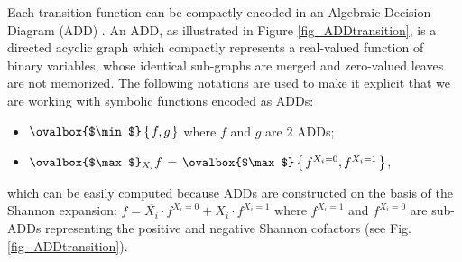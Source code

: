 Each transition function can be compactly encoded in an Algebraic Decision
Diagram (ADD) \cite{Bahar:1997:ADD}. 
An ADD, as illustrated in Figure \ref{fig_ADDtransition}, 
is a directed acyclic graph which compactly represents a
real-valued function of binary variables, whose identical sub-graphs are
merged and zero-valued leaves are not memorized. 
The following notations are used to make it 
explicit that we are working with symbolic functions encoded as ADDs:
\begin{itemize}
\item $\ovalbox{$\min$} \set{f,g}$ where $f$ and $g$ are 2 ADDs;
\item $\ovalbox{$\max$}_{X_i} f$ = $\ovalbox{$\max$} \set{ f^{X_i=0},f^{X_i=1} }$, 
\end{itemize}
which can be easily computed because ADDs are constructed on the basis of the 
Shannon expansion: $f = \overline{X_i} \cdot f^{X_i=0} + X_i \cdot f^{X_i=1}$ 
where $f^{X_i=1}$ and $f^{X_i=0}$ are sub-ADDs representing the positive and 
negative Shannon cofactors (see Fig. \ref{fig_ADDtransition}). 

